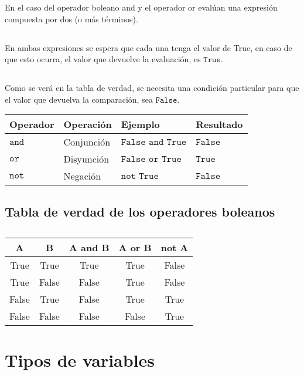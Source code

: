\documentclass[]{article}
\begin{document}
En el caso del operador boleano and y el operador or evalúan una
expresión compuesta por dos (o más términos).

\subsection{}\label{section-5}

En ambas expresiones se espera que cada una tenga el valor de True, en
caso de que esto ocurra, el valor que devuelve la evaluación, es
\(\texttt{True}\).

\subsection{}\label{section-6}

Como se verá en la tabla de verdad, se necesita una condición particular
para que el valor que devuelva la comparación, sea \(\texttt{False}\).

\begin{longtable}[]{@{}llll@{}}
\toprule
Operador & Operación & Ejemplo & Resultado\tabularnewline
\midrule
\endhead
\(\texttt{and}\) & Conjunción & \(\texttt{False and True}\) &
\(\texttt{False}\)\tabularnewline
\(\texttt{or}\) & Disyunción & \(\texttt{False or True}\) &
\(\texttt{True}\)\tabularnewline
\(\texttt{not}\) & Negación & \(\texttt{not True}\) &
\(\texttt{False}\)\tabularnewline
\bottomrule
\end{longtable}

\subsection{Tabla de verdad de los operadores
boleanos}\label{tabla-de-verdad-de-los-operadores-boleanos}

\subsection{}\label{section-7}

\begin{longtable}[]{@{}ccccc@{}}
\toprule
A & B & A and B & A or B & not A\tabularnewline
\midrule
\endhead
True & True & True & True & False\tabularnewline
True & False & False & True & False\tabularnewline
False & True & False & True & True\tabularnewline
False & False & False & False & True\tabularnewline
\bottomrule
\end{longtable}

\section{Tipos de variables}\label{tipos-de-variables}
\end{document}
